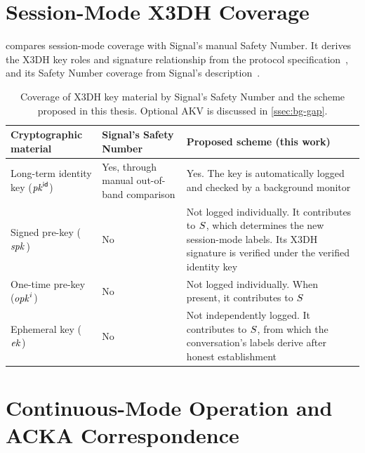 \section{Session-Mode X3DH Coverage}\label{sec:design-detail-x3dh}

 compares session-mode coverage with Signal's manual Safety Number.
It derives the X3DH key roles and signature relationship from the protocol
specification~\cite[Sections~2.4 and~3.2--3.3]{x3dh}, and its Safety Number coverage from Signal's
description~\cite{safetynumbers}.

\begin{table}[ht]
\centering
\caption[X3DH key-material coverage: Signal versus this thesis.]{Coverage of X3DH key material by
Signal's Safety Number and the scheme proposed in this thesis. Optional AKV is discussed in
\cref{ssec:bg-gap}.}
\label{tab:design-x3dh-coverage}
\small
\renewcommand{\arraystretch}{1.4}
\begin{tabularx}{\textwidth}{@{}>{\raggedright\arraybackslash}p{3.4cm}
>{\raggedright\arraybackslash}X>{\raggedright\arraybackslash}X@{}}
\toprule
Cryptographic material & Signal's Safety Number & Proposed scheme (this work) \\
\midrule
Long-term identity key ($\mathit{pk}^{\mathsf{id}}_{}$) & Yes, through manual out-of-band comparison &
  Yes. The key is automatically logged and checked by a background monitor \\
Signed pre-key ($\mathit{spk}_{}$) & No &
  Not logged individually. It contributes to $S$, which determines the new session-mode
  labels. Its X3DH signature is verified under the verified identity key \\
One-time pre-key ($\mathit{opk}^{i}_{}$) & No &
  Not logged individually. When present, it contributes to $S$ \\
Ephemeral key ($\mathit{ek}_{}$) & No &
  Not independently logged. It contributes to $S$, from which the conversation's labels
  derive after honest establishment \\
\bottomrule
\end{tabularx}
\end{table}

\section{Continuous-Mode Operation and ACKA Correspondence}\label{sec:design-detail-cea}

